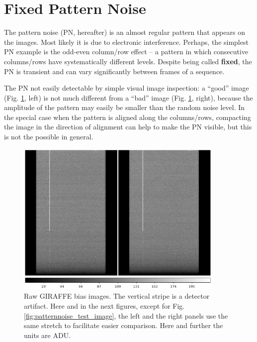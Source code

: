 \section{Fixed Pattern Noise}
\label{chap:patternnoise}

\def\hdrlfpn{{\em hdrl\_fpn}}

The pattern noise (PN, hereafter) is an almost regular pattern that 
appears on the images. Most likely it is due to electronic 
interference. Perhaps, the simplest PN example is the odd-even 
column/row effect -- a pattern in which consecutive
columns/rows  
have systematically different levels. 
Despite being called {\bf fixed}, the PN is transient and can vary
significantly between frames  of a sequence.

The PN not easily detectable by simple visual image inspection: a 
``good'' image (Fig. \ref{fig:patternnoise_non_diff}, left) is not 
much different from a ``bad'' image (Fig. \ref{fig:patternnoise_non_diff}, 
right), because the amplitude of the pattern may easily be smaller 
than the random noise level. In the special case when the pattern 
is aligned along the columns/rows, compacting the image in the 
direction of alignment can help to make the PN visible, but this 
is not the possible in general.

\begin{figure}[H]
  \centering \subfigure
  \includegraphics[width=10.0cm]{figures/patternnoise_non-diff.png} 
  \caption[]{\footnotesize Raw GIRAFFE bias images. The vertical stripe 
  is a detector artifact. Here and in the next figures, except for 
  Fig. \ref{fig:patternnoise_test_image}, the left and the right panels 
  use the same stretch to facilitate easier comparison. Here and further 
  the units are ADU.}
  \label{fig:patternnoise_non_diff}
\end{figure}


